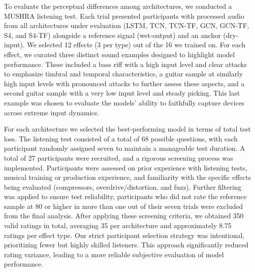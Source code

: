 To evaluate the perceptual differences among architectures, we conducted a MUSHRA listening test. 
Each trial presented participants with processed audio from all architectures under evaluation (LSTM, TCN, TCN-TF, GCN, GCN-TF, S4, and S4-TF) alongside a reference signal (wet-output) and an anchor (dry-input). 
We selected 12 effects (3 per type) out of the 16 we trained on.
For each effect, we curated three distinct sound examples designed to highlight model performance. 
These included a bass riff with a high input level and clear attacks to emphasize timbral and temporal characteristics, a guitar sample at similarly high input levels with pronounced attacks to further assess these aspects, and a second guitar sample with a very low input level and steady picking. 
This last example was chosen to evaluate the models’ ability to faithfully capture devices across extreme input dynamics. 

For each architecture we selected the best-performing model in terms of total test loss.
The listening test consisted of a total of 68 possible questions, with each participant randomly assigned seven to maintain a manageable test duration. 
A total of 27 participants were recruited, and a rigorous screening process was implemented. 
Participants were assessed on prior experience with listening tests, musical training or production experience, and familiarity with the specific effects being evaluated (compressors, overdrive/distortion, and fuzz). 
Further filtering was applied to ensure test reliability, participants who did not rate the reference sample at 80 or higher in more than one out of their seven trials were excluded from the final analysis. After applying these screening criteria, we obtained 350 valid ratings in total, averaging 35 per architecture and approximately 8.75 ratings per effect type.
Our strict participant selection strategy was intentional, prioritizing fewer but highly skilled listeners. 
This approach significantly reduced rating variance, leading to a more reliable subjective evaluation of model performance.

